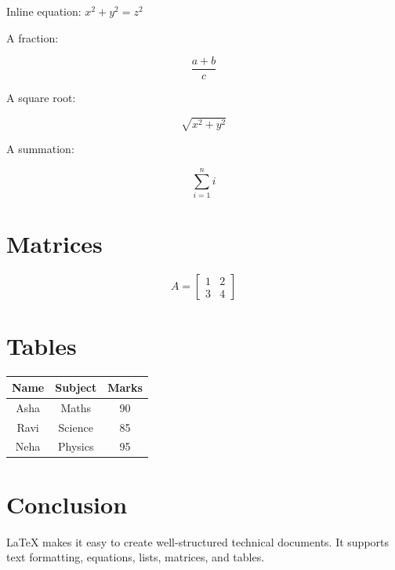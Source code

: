 \documentclass[12pt,a4paper]{article}
\begin{document}
Inline equation: \(x^2+y^2=z^2\)

A fraction:

\[
\frac{a+b}{c}
\]

A square root:

\[
\sqrt{x^2+y^2}
\]

A summation:

\[
\sum_{i=1}^{n} i
\]

\section{Matrices}

\[
A =
\begin{bmatrix}
1 & 2 \\
3 & 4
\end{bmatrix}
\]

\section{Tables}

\begin{center}
\begin{tabular}{|c|c|c|}
\hline
Name & Subject & Marks \\
\hline
Asha & Maths & 90 \\
Ravi & Science & 85 \\
Neha & Physics & 95 \\
\hline
\end{tabular}
\end{center}

\section{Conclusion}

LaTeX makes it easy to create
well-structured technical documents.
It supports text formatting, equations,
lists, matrices, and tables.
\end{document}

